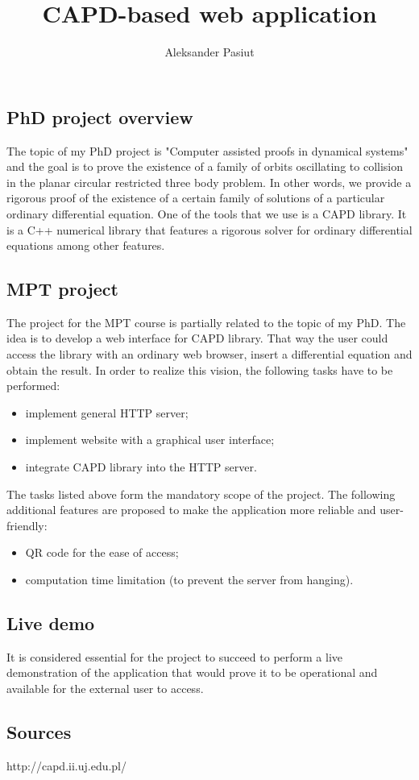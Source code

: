 \documentclass[12pt, a4paper]{article}
\title{CAPD-based web application}
\author{Aleksander Pasiut}
\begin{document}
\maketitle

\subsection*{PhD project overview}
The topic of my PhD project is "Computer assisted proofs in dynamical systems" and the goal is to prove the existence of a family of orbits oscillating to collision in the planar circular restricted three body problem. In other words, we provide a rigorous proof of the existence of a certain family of solutions of a particular ordinary differential equation. One of the tools that we use is a CAPD library. It is a C++ numerical library that features a rigorous solver for ordinary differential equations among other features.  

\subsection*{MPT project}
The project for the MPT course is partially related to the topic of my PhD. The idea is to develop a web interface for CAPD library. That way the user could access the library with an ordinary web browser, insert a differential equation and obtain the result. In order to realize this vision, the following tasks have to be performed: 
\begin{itemize}
\item implement general HTTP server; 
\item implement website with a graphical user interface; 
\item integrate CAPD library into the HTTP server. 
\end{itemize}

The tasks listed above form the mandatory scope of the project. The following additional features are proposed to make the application more reliable and user-friendly: 
\begin{itemize}
\item QR code for the ease of access;
\item computation time limitation (to prevent the server from hanging). 
\end{itemize}

\subsection*{Live demo}
It is considered essential for the project to succeed to perform a live demonstration of the application that would prove it to be operational and available for the external user to access. 

\subsection*{Sources}
http://capd.ii.uj.edu.pl/ 
\end{document}
